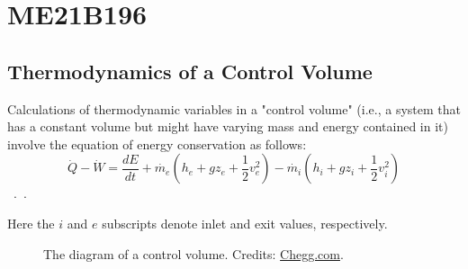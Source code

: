 \section{ME21B196}

\subsection{Thermodynamics of a Control Volume}

Calculations of thermodynamic variables in a "control volume" (i.e., a system that has a constant volume but might have varying mass and energy contained in it) involve the equation of energy conservation as follows:
$$\dot{Q} - \dot{W} = \dfrac{dE}{dt} + \dot{m_e}(h_e + gz_e + \dfrac{1}{2}v_e^2) - \dot{m_i}(h_i + gz_i + \dfrac{1}{2}v_i^2)$$~\cite{cvpsu}.~\cite{cvsfu}.

Here the $i$ and $e$ subscripts denote inlet and exit values, respectively.

\begin{figure}[h]

	\begin{center}
	\end{center}
	
	\caption{The diagram of a control volume. Credits: \href{https://www.chegg.com/homework-help/fundamentals-of-engineering-thermodynamics-8th-edition-chapter-4-problem-1e-solution-9781118412930}{Chegg.com}.}

	\label{CV}
\end{figure}

